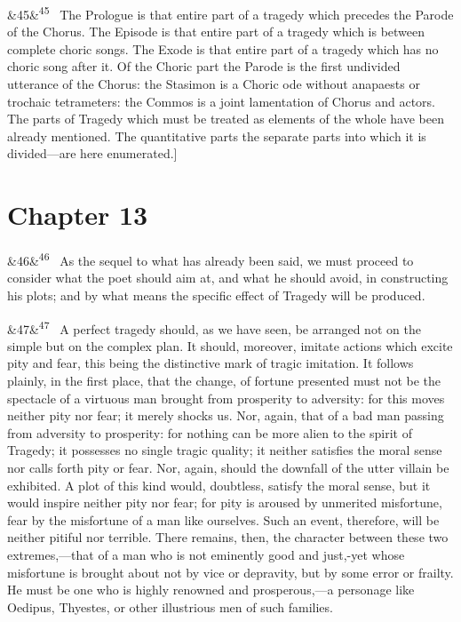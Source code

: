 \documentclass[12pt]{article}
\newcommand{\para}[1][]{\par\noindent\ifx&#1&\else\textsuperscript{\footnotesize #1}~\fi}
\begin{document}
\para[45] The Prologue is that entire part of a tragedy which precedes the Parode of the Chorus. The Episode is that entire part of a tragedy which is between complete choric songs. The Exode is that entire part of a tragedy which has no choric song after it. Of the Choric part the Parode is the first undivided utterance of the Chorus: the Stasimon is a Choric ode without anapaests or trochaic tetrameters: the Commos is a joint lamentation of Chorus and actors. The parts of Tragedy which must be treated as elements of the whole have been already mentioned. The quantitative parts the separate parts into which it is divided---are here enumerated.]

\section*{Chapter 13}

\para[46] As the sequel to what has already been said, we must proceed to consider what the poet should aim at, and what he should avoid, in constructing his plots; and by what means the specific effect of Tragedy will be produced.

\para[47] A perfect tragedy should, as we have seen, be arranged not on the simple but on the complex plan. It should, moreover, imitate actions which excite pity and fear, this being the distinctive mark of tragic imitation. It follows plainly, in the first place, that the change, of fortune presented must not be the spectacle of a virtuous man brought from prosperity to adversity: for this moves neither pity nor fear; it merely shocks us. Nor, again, that of a bad man passing from adversity to prosperity: for nothing can be more alien to the spirit of Tragedy; it possesses no single tragic quality; it neither satisfies the moral sense nor calls forth pity or fear. Nor, again, should the downfall of the utter villain be exhibited. A plot of this kind would, doubtless, satisfy the moral sense, but it would inspire neither pity nor fear; for pity is aroused by unmerited misfortune, fear by the misfortune of a man like ourselves. Such an event, therefore, will be neither pitiful nor terrible. There remains, then, the character between these two extremes,---that of a man who is not eminently good and just,-yet whose misfortune is brought about not by vice or depravity, but by some error or frailty. He must be one who is highly renowned and prosperous,---a personage like Oedipus, Thyestes, or other illustrious men of such families.
\end{document}

